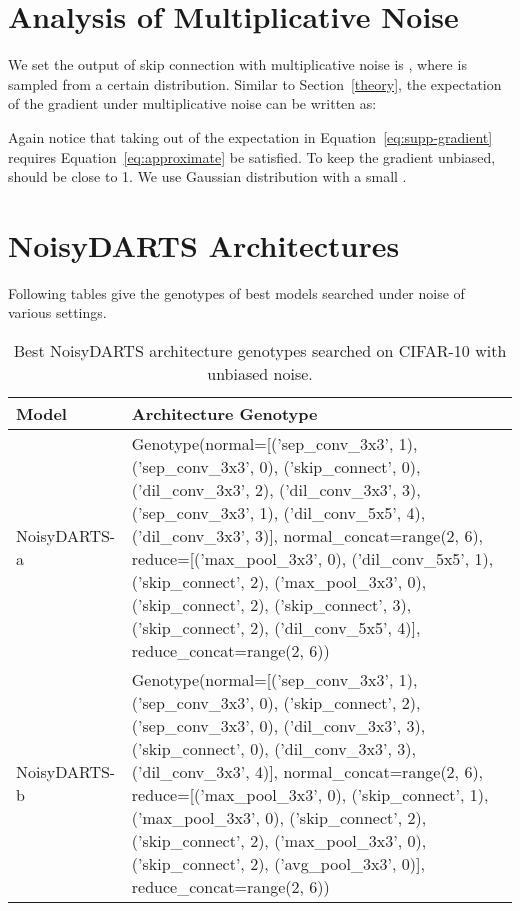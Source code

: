 \documentclass{article}
\begin{document}
 

\clearpage

\appendix
\section{Analysis of Multiplicative Noise}\label{supp:multi-noise}
We set the output of skip connection with  multiplicative noise is , where  is sampled from a certain distribution. Similar to Section~\ref{theory}, the expectation of the gradient under multiplicative noise can be written as:

Again notice that taking   out of the expectation in Equation~\ref{eq:supp-gradient} requires Equation~\ref{eq:approximate} be satisfied. 
 To keep the gradient unbiased,  should be close to 1. We use Gaussian distribution  with a small .



\section{NoisyDARTS Architectures}

Following tables give the genotypes of best models searched under noise of various settings.

\begin{table}[ht]
	\begin{center}
		\caption{Best NoisyDARTS architecture genotypes searched on CIFAR-10 with unbiased noise.}
		\label{table:genotypes}
		\begin{tabular}{lp{300pt}}
			\toprule
			Model &  Architecture Genotype \\
			\midrule
			NoisyDARTS-a & Genotype(normal=[('sep\_conv\_3x3', 1), ('sep\_conv\_3x3', 0), ('skip\_connect', 0), ('dil\_conv\_3x3', 2), ('dil\_conv\_3x3', 3), ('sep\_conv\_3x3', 1), ('dil\_conv\_5x5', 4), ('dil\_conv\_3x3', 3)], normal\_concat=range(2, 6), reduce=[('max\_pool\_3x3', 0), ('dil\_conv\_5x5', 1), ('skip\_connect', 2), ('max\_pool\_3x3', 0), ('skip\_connect', 2), ('skip\_connect', 3), ('skip\_connect', 2), ('dil\_conv\_5x5', 4)], reduce\_concat=range(2, 6))
			 \\
			NoisyDARTS-b & Genotype(normal=[('sep\_conv\_3x3', 1), ('sep\_conv\_3x3', 0), ('skip\_connect', 2), ('sep\_conv\_3x3', 0), ('dil\_conv\_3x3', 3), ('skip\_connect', 0), ('dil\_conv\_3x3', 3), ('dil\_conv\_3x3', 4)], normal\_concat=range(2, 6), reduce=[('max\_pool\_3x3', 0), ('skip\_connect', 1), ('max\_pool\_3x3', 0), ('skip\_connect', 2), ('skip\_connect', 2), ('max\_pool\_3x3', 0), ('skip\_connect', 2), ('avg\_pool\_3x3', 0)], reduce\_concat=range(2, 6))
			 \\
			\bottomrule
		\end{tabular}
	\end{center}
\end{table}
\end{document}
